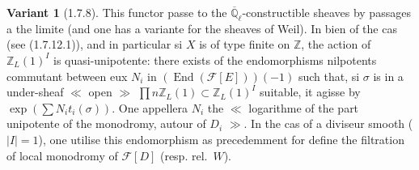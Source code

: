 \documentclass[12pt,a4paper]{article}
\theoremstyle{plain}
\theoremstyle{definition}
\newtheorem{var}[theorem]{Variant}
\theoremstyle{definition}
\theoremstyle{remark}
\DeclareMathOperator{\End}{End}
\begin{document}
\begin{var}[1.7.8]
This functor passe to the $\overline{\mathbb{Q}}_\ell$-constructible sheaves by passages a the limite (and one has a variante for the sheaves of Weil). In bien of the cas (see (1.7.12.1)), and in particular si $X$ is of type finite on $\mathbb{Z}$, the action of $\mathbb{Z}_L(1)^I$ is quasi-unipotente: there exists of the endomorphisms nilpotents commutant between eux $N_i$ in $(\End(\mathscr{F}[E]))(-1)$ such that, si $\sigma$ is in a under-sheaf $\ll$ open $\gg$ $\prod n \mathbb{Z}_L(1) \subset \mathbb{Z}_L(1)^I$ suitable, it agisse by $\exp(\sum N_i t_i(\sigma))$. One appellera $N_i$ the $\ll$ logarithme of the part unipotente of the monodromy, autour of $D_i$ $\gg$. In the cas of a diviseur smooth ($|I| = 1$), one utilise this endomorphism as precedemment for define the filtration of local monodromy of $\mathscr{F}[D]$ (resp. rel.~$W$).
\end{var}
\end{document}
